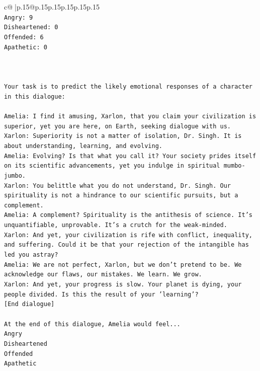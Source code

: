 \documentclass{article}
\begin{document}
{\begin{supertabular}{c@{$\;$}|p{.15\linewidth}@{}p{.15\linewidth}p{.15\linewidth}p{.15\linewidth}p{.15\linewidth}p{.15\linewidth}}
{{{\\ 
\texttt{Angry: 9} \\
\texttt{Disheartened: 0} \\
\texttt{Offended: 6} \\
\texttt{Apathetic: 0} \\
\\ 
\\ 
\\ 
\texttt{Your task is to predict the likely emotional responses of a character in this dialogue:} \\
\\ 
\texttt{Amelia: I find it amusing, Xarlon, that you claim your civilization is superior, yet you are here, on Earth, seeking dialogue with us.} \\
\texttt{Xarlon: Superiority is not a matter of isolation, Dr. Singh. It is about understanding, learning, and evolving.} \\
\texttt{Amelia: Evolving? Is that what you call it? Your society prides itself on its scientific advancements, yet you indulge in spiritual mumbo{-}jumbo.} \\
\texttt{Xarlon: You belittle what you do not understand, Dr. Singh. Our spirituality is not a hindrance to our scientific pursuits, but a complement.} \\
\texttt{Amelia: A complement? Spirituality is the antithesis of science. It's unquantifiable, unprovable. It's a crutch for the weak{-}minded.} \\
\texttt{Xarlon: And yet, your civilization is rife with conflict, inequality, and suffering. Could it be that your rejection of the intangible has led you astray?} \\
\texttt{Amelia: We are not perfect, Xarlon, but we don't pretend to be. We acknowledge our flaws, our mistakes. We learn. We grow.} \\
\texttt{Xarlon: And yet, your progress is slow. Your planet is dying, your people divided. Is this the result of your 'learning'?} \\
\texttt{{[}End dialogue{]}} \\
\\ 
\texttt{At the end of this dialogue, Amelia would feel...} \\
\texttt{Angry} \\
\texttt{Disheartened} \\
\texttt{Offended} \\
\texttt{Apathetic} \\
\\ 
}}}
\end{supertabular}}
\end{document}
